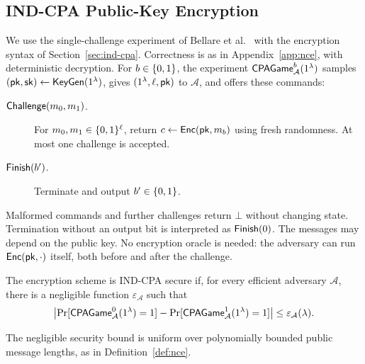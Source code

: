 \subsection{IND-CPA Public-Key Encryption}
\label{app:ind-cpa}

We use the single-challenge experiment of Bellare et al.\
\cite[full version, Definition~2.1]{BellareEtAl1998EncryptionNotions}
with the encryption syntax of Section~\ref{sec:ind-cpa}. Correctness is
as in Appendix~\ref{app:nce}, with deterministic decryption.
For $b\in\{0,1\}$, the experiment $\mathsf{CPAGame}^b_{\mathcal A}(1^\lambda)$
samples $(\mathsf{pk},\mathsf{sk})\mathrel{\leftarrow}\mathsf{KeyGen}(1^\lambda)$, gives
$(1^\lambda,\ell,\mathsf{pk})$ to $\mathcal A$, and offers these commands:
\begin{description}
  \item[$\mathsf{Challenge}(m_0,m_1)$.]
    For $m_0,m_1\in\{0,1\}^\ell$, return
    $c\mathrel{\leftarrow}\mathsf{Enc}(\mathsf{pk},m_b)$ using fresh randomness.
    At most one challenge is accepted.
  \item[$\mathsf{Finish}(b')$.]
    Terminate and output $b'\in\{0,1\}$.
\end{description}
Malformed commands and further challenges return $\bot$ without changing
state.  Termination without an output bit is interpreted as $\mathsf{Finish}(0)$.
The messages may depend on the public key.  No encryption oracle is
needed: the adversary can run $\mathsf{Enc}(\mathsf{pk},\cdot)$ itself, both before
and after the challenge.

\begin{definition}
\label{def:ind-cpa}
The encryption scheme is IND-CPA secure if, for every efficient adversary
$\mathcal A$, there is a negligible function $\varepsilon_{\mathcal A}$
such that
\[
  \left|
    \Pr[\mathsf{CPAGame}^0_{\mathcal A}(1^\lambda)=1]
    -\Pr[\mathsf{CPAGame}^1_{\mathcal A}(1^\lambda)=1]
  \right|\leq\varepsilon_{\mathcal A}(\lambda).
\]
\end{definition}

The negligible security bound is uniform over polynomially bounded
public message lengths, as in Definition~\ref{def:nce}.

